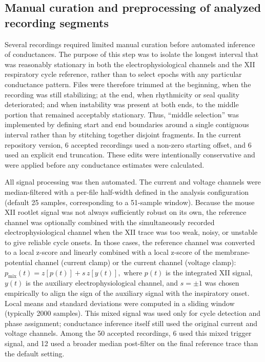 \documentclass[
]{article}
\begin{document}
\subsection{Manual curation and preprocessing of analyzed recording segments}\label{manual-curation-and-preprocessing-of-analyzed-recording-segments}

Several recordings required limited manual curation before automated inference of conductances. The purpose of this step was to isolate the longest interval that was reasonably stationary in both the electrophysiological channels and the XII respiratory cycle reference, rather than to select epochs with any particular conductance pattern. Files were therefore trimmed at the beginning, when the recording was still stabilizing; at the end, when rhythmicity or seal quality deteriorated; and when instability was present at both ends, to the middle portion that remained acceptably stationary. Thus, ``middle selection'' was implemented by defining start and end boundaries around a single contiguous interval rather than by stitching together disjoint fragments. In the current repository version, 6 accepted recordings used a non-zero starting offset, and 6 used an explicit end truncation. These edits were intentionally conservative and were applied before any conductance estimates were calculated.

All signal processing was then automated. The current and voltage channels were median-filtered with a per-file half-width defined in the analysis configuration (default 25 samples, corresponding to a 51-sample window). Because the mouse XII rootlet signal was not always sufficiently robust on its own, the reference channel was optionally combined with the simultaneously recorded electrophysiological channel when the XII trace was too weak, noisy, or unstable to give reliable cycle onsets. In those cases, the reference channel was converted to a local z-score and linearly combined with a local z-score of the membrane-potential channel (current clamp) or the current channel (voltage clamp): \(p_{\mathrm{mix}}(t) = z\!\left[p(t)\right] + s\,z\!\left[y(t)\right],\) where \(p(t)\) is the integrated XII signal, \(y(t)\) is the auxiliary electrophysiological channel, and \(s = \pm 1\) was chosen empirically to align the sign of the auxiliary signal with the inspiratory onset. Local means and standard deviations were computed in a sliding window (typically 2000 samples). This mixed signal was used only for cycle detection and phase assignment; conductance inference itself still used the original current and voltage channels. Among the 50 accepted recordings, 6 used this mixed trigger signal, and 12 used a broader median post-filter on the final reference trace than the default setting.
\end{document}
